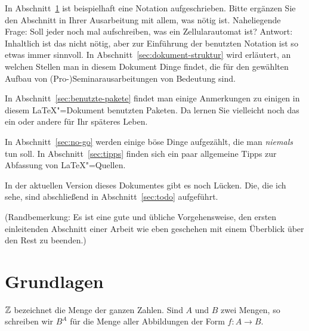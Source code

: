 In Abschnitt~\ref{sec:grundlagen} ist beispielhaft eine Notation aufgeschrieben.
Bitte ergänzen Sie den Abschnitt in Ihrer Ausarbeitung mit allem, was
nötig ist.
%
Naheliegende Frage: Soll jeder noch mal aufschreiben, was ein
Zellularautomat ist?
%
Antwort: Inhaltlich ist das nicht nötig, aber zur Einführung der
benutzten Notation ist so etwas immer sinnvoll.
% 
%
In Abschnitt~\ref{sec:dokument-struktur} wird erläutert, an welchen Stellen
man in diesem Dokument Dinge findet, die für den gewählten Aufbau von
(Pro-)Seminarausarbeitungen von Bedeutung sind.

In Abschnitt~\ref{sec:benutzte-pakete} findet man einige Anmerkungen
zu einigen in diesem \LaTeX"=Dokument benutzten Paketen.
%
Da lernen Sie vielleicht noch das ein oder andere für Ihr späteres
Leben.

In Abschnitt~\ref{sec:no-go} werden einige böse Dinge aufgezählt, die man
\emph{niemals} tun soll.
%
In Abschnitt~\ref{sec:tipps} finden sich ein paar allgemeine Tipps zur
Abfassung von \LaTeX"=Quellen.

In der aktuellen Version dieses Dokumentes gibt es noch Lücken. Die, die ich
sehe, sind abschließend in Abschnitt~\ref{sec:todo} aufgeführt.

(Randbemerkung: Es ist eine gute und übliche Vorgehensweise, den ersten
einleitenden Abschnitt einer Arbeit wie eben geschehen mit einem Überblick
über den Rest zu beenden.)

\section{Grundlagen}
\label{sec:grundlagen}

$\mathbb{Z}$ bezeichnet die Menge der ganzen Zahlen. Sind $A$ und $B$ zwei Mengen, so
schreiben wir $B^A$ für die Menge aller Abbildungen der Form $f \colon A\to
B$.

